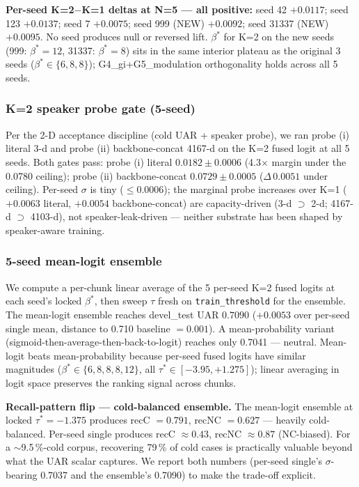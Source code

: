 \textbf{Per-seed K=2$-$K=1 deltas at N=5 — all positive:} seed 42 $+0.0117$; seed 123 $+0.0137$; seed 7 $+0.0075$; seed 999 (NEW) $+0.0092$; seed 31337 (NEW) $+0.0095$. No seed produces null or reversed lift. $\beta^*$ for K=2 on the new seeds (999: $\beta^*{=}12$, 31337: $\beta^*{=}8$) sits in the same interior plateau as the original 3 seeds ($\beta^* \in \{6, 8, 8\}$); G4\_gi+G5\_modulation orthogonality holds across all 5 seeds.

\subsubsection{K=2 speaker probe gate (5-seed)}

Per the 2-D acceptance discipline (cold UAR + speaker probe), we ran probe (i) literal 3-d and probe (ii) backbone-concat 4167-d on the K=2 fused logit at all 5 seeds. Both gates pass: probe (i) literal $0.0182 \pm 0.0006$ (4.3$\times$ margin under the 0.0780 ceiling); probe (ii) backbone-concat $0.0729 \pm 0.0005$ ($\Delta\,0.0051$ under ceiling). Per-seed $\sigma$ is tiny ($\leq 0.0006$); the marginal probe increases over K=1 ($+0.0063$ literal, $+0.0054$ backbone-concat) are capacity-driven (3-d $\supset$ 2-d; 4167-d $\supset$ 4103-d), not speaker-leak-driven — neither substrate has been shaped by speaker-aware training.

\subsubsection{5-seed mean-logit ensemble}
\label{ssec:ensemble}

We compute a per-chunk linear average of the 5 per-seed K=2 fused logits at each seed's locked $\beta^*$, then sweep $\tau$ fresh on \texttt{train\_threshold} for the ensemble. The mean-logit ensemble reaches devel\_test UAR $\mathbf{0.7090}$ ($+0.0053$ over per-seed single mean, distance to 0.710 baseline $= 0.001$). A mean-probability variant (sigmoid-then-average-then-back-to-logit) reaches only 0.7041 — neutral. Mean-logit beats mean-probability because per-seed fused logits have similar magnitudes ($\beta^* \in \{6, 8, 8, 8, 12\}$, all $\tau^* \in [-3.95, +1.275]$); linear averaging in logit space preserves the ranking signal across chunks.

\textbf{Recall-pattern flip — cold-balanced ensemble.} The mean-logit ensemble at locked $\tau^* = -1.375$ produces recC $= 0.791$, recNC $= 0.627$ — heavily cold-balanced. Per-seed single produces recC $\approx 0.43$, recNC $\approx 0.87$ (NC-biased). For a $\sim$9.5\,\%-cold corpus, recovering 79\,\% of cold cases is practically valuable beyond what the UAR scalar captures. We report both numbers (per-seed single's $\sigma$-bearing 0.7037 and the ensemble's 0.7090) to make the trade-off explicit.

